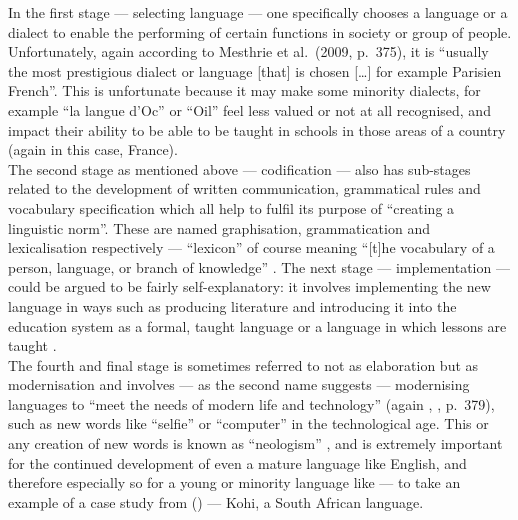 \documentclass[12pt]{article}
\begin{document}
In the first stage --- selecting language --- one specifically chooses
a language or a dialect to enable the performing of certain functions
in society or group of people. Unfortunately, again according to
Mesthrie et al.\ (2009, p.\ 375), it is ``usually the most prestigious
dialect or language [that] is chosen [\ldots] for example Parisien
French''.  This is unfortunate because it may make some minority
dialects, for example ``la langue d'Oc'' or ``Oil'' feel less valued
or not at all recognised, and impact their ability to be able to be
taught in schools in those areas of a country (again in this case,
France).\\

The second stage as mentioned above --- codification --- also has
sub-stages related to the development of written communication,
grammatical rules and vocabulary specification which all help to
fulfil its purpose of ``creating a linguistic norm''\citep[p.\
375]{sociolinguistics-mesthrie}. These are named graphisation,
grammatication and lexicalisation respectively --- ``lexicon'' of
course meaning ``[t]he vocabulary of a person, language, or branch of
knowledge'' \citep{oed-lexicon}. The next stage --- implementation ---
could be argued to be fairly self-explanatory: it involves
implementing the new language in ways such as producing literature and
introducing it into the education system as a formal, taught language
or a language in which lessons are taught \citep[p.\
378]{sociolinguistics-mesthrie}.\\

The fourth and final stage is sometimes referred to not as elaboration
but as modernisation \citep[p.\ 379]{sociolinguistics-mesthrie} and
involves --- as the second name suggests --- modernising languages to
``meet the needs of modern life and technology'' (again
\citeauthor{sociolinguistics-mesthrie},
\citeyear{sociolinguistics-mesthrie}, p.\ 379), such as new words like
``selfie'' or ``computer'' in the technological age. This or any
creation of new words is known as ``neologism'' \citep{oed-neologism},
and is extremely important for the continued development of even a
mature language like English, and therefore especially so for a young
or minority language like --- to take an example of a case study from
\citeauthor{sociolinguistics-mesthrie}
(\citeyear{sociolinguistics-mesthrie}) --- Kohi, a South African
language.\\
\end{document}
